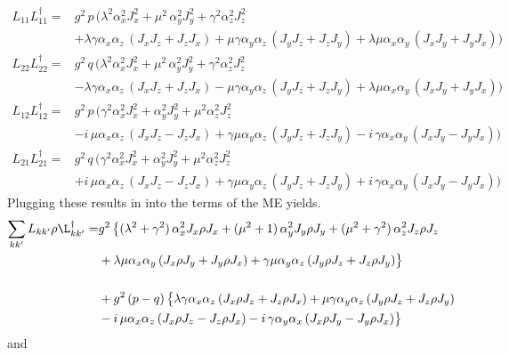 \documentclass{article}
\begin{document}
\begin{align*}
    L_{11}L_{11}^\dagger=&g^2\,p\,\big(\lambda^2\alpha_x^2J_x^2+\mu^2\,\alpha_y^2J_y^2+\gamma^2\alpha_z^2J_z^2\\
    &+\lambda\gamma\alpha_x\alpha_z\,(J_xJ_z+J_zJ_x)+\mu\gamma\alpha_y\alpha_z\,(J_yJ_z+J_zJ_y)+\lambda\mu\alpha_x\alpha_y\,(J_xJ_y+J_yJ_x)\big)\\
    L_{22}L_{22}^\dagger=&g^2\,q\,\big(\lambda^2\alpha_x^2J_x^2+\mu^2\,\alpha_y^2J_y^2+\gamma^2\alpha_z^2J_z^2\\
    &-\lambda\gamma\alpha_x\alpha_z\,(J_xJ_z+J_zJ_x)-\mu\gamma\alpha_y\alpha_z\,(J_yJ_z+J_zJ_y)+\lambda\mu\alpha_x\alpha_y\,(J_xJ_y+J_yJ_x)\big)\\
    L_{12}L_{12}^\dagger=&g^2\,p\,\big(\gamma^2\alpha_x^2J_x^2+\alpha_y^2J_y^2+\mu^2\alpha_z^2J_z^2\\
    &-i\,\mu\alpha_x\alpha_z\,(J_xJ_z-J_zJ_x)+\gamma\mu\alpha_y\alpha_z\,(J_yJ_z+J_zJ_y)-i\,\gamma\alpha_x\alpha_y\,(J_xJ_y-J_yJ_x)\big)\\
    L_{21}L_{21}^\dagger=&g^2\,q\,\big(\gamma^2\alpha_x^2J_x^2+\alpha_y^2J_y^2+\mu^2\alpha_z^2J_z^2\\
    &+i\,\mu\alpha_x\alpha_z\,(J_xJ_z-J_zJ_x)+\gamma\mu\alpha_y\alpha_z\,(J_yJ_z+J_zJ_y)+i\,\gamma\alpha_x\alpha_y\,(J_xJ_y-J_yJ_x)\big)
\end{align*}
Plugging these results in into the terms of the ME yields.
\begin{align*}
    \sum_{kk'}L_{kk'}\rho\L_{kk'}^\dagger=&g^2\,\big\{(\lambda^2+\gamma^2)\,\alpha_x^2J_x\rho J_x+(\mu^2+1)\,\alpha_y^2 J_y \rho J_y+(\mu^2+\gamma^2)\,\alpha_z^2 J_z \rho J_z\\
    &+\lambda\mu\alpha_x\alpha_y\,(J_x \rho J_y + J_y \rho J_x)+\gamma\mu\alpha_y\alpha_z\,(J_y \rho J_z + J_z \rho J_y)\big\}\\\\
    &+g^2\,(p-q)\,\big\{\lambda\gamma\alpha_x\alpha_z\,(J_x \rho J_z+J_z \rho J_x)+\mu\gamma\alpha_y\alpha_z\,(J_y \rho J_z+J_z \rho J_y)\\
    &-i\,\mu\alpha_x\alpha_z\,(J_x \rho J_z-J_z \rho J_x)-i\,\gamma\alpha_y\alpha_x\,(J_x \rho J_y-J_y \rho J_x)\big\}
\end{align*}
and 
\end{document}
